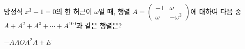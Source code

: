 \hspace*{2mm}\begin{minipage}[t]{\dimexpr\linewidth-2mm\relax}\vspace{0pt}
방정식 $x^3-1=0$의 한 허근이 $\omega$일 때, 행렬 $A=\begin{pmatrix} -1 & \omega \\ \omega & -\omega^2 \end{pmatrix}$에 대하여 다음 중 $A+A^2+A^3+\cdots+A^{100}$과 같은 행렬은? 
\begin{choices32}{$-A$}{$A$}{$O$}{$A^2$}{$A+E$}\end{choices32}\end{minipage}
